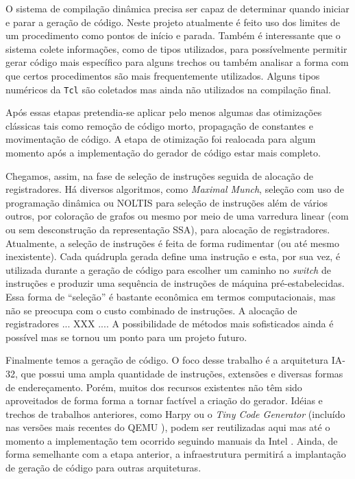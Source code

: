 O sistema de compilação dinâmica precisa ser
capaz de determinar quando iniciar e parar a geração de código.
Neste projeto atualmente é feito uso dos
limites de um procedimento como pontos de início e parada. Também é
interessante que o sistema colete informações, como de tipos
utilizados, para possívelmente permitir gerar código mais específico
para alguns trechos ou também analisar a forma com que certos procedimentos
são mais frequentemente utilizados. Alguns tipos numéricos da
\texttt{Tcl} são coletados mas ainda não utilizados na compilação final.

Após essas etapas pretendia-se aplicar pelo menos algumas das
otimizações clássicas tais como remoção de código morto, propagação de
constantes e movimentação de código. A etapa de otimização foi
realocada para algum momento após a implementação do gerador de código
estar mais completo.

Chegamos, assim, na fase de seleção de instruções
seguida de alocação de registradores. Há diversos algoritmos, como
\textit{Maximal Munch}, seleção com uso de programação dinâmica ou
NOLTIS \cite{noltis}  para seleção de instruções além de vários
outros, por coloração de grafos ou mesmo por meio de uma varredura
linear \cite{linear_scan_regalloc} (com ou sem \cite{wimmer_franz}
desconstrução da representação SSA), para alocação de registradores.
Atualmente, a seleção de instruções é feita de forma
rudimentar (ou até mesmo inexistente). Cada quádrupla gerada define uma
instrução e esta, por sua vez, é utilizada durante a geração de código
para escolher um caminho no \textit{switch} de instruções e produzir
uma sequência de instruções de máquina pré-estabelecidas. Essa forma
de ``seleção'' é bastante econômica em termos computacionais, mas não
se preocupa com o custo combinado de instruções. A alocação de
registradores ... XXX ....
A possibilidade de métodos mais sofisticados ainda é
possível mas se tornou um ponto para um projeto futuro.

Finalmente temos a geração de código. O foco desse trabalho é a
arquitetura IA-32, que possui uma ampla quantidade de instruções, extensões e
diversas formas de endereçamento.
Porém, muitos dos recursos existentes não têm sido aproveitados de forma
forma a tornar factível a criação do gerador.
Idéias e trechos de trabalhos anteriores, como Harpy \cite{harpy}
ou o \textit{Tiny Code Generator} (incluído nas versões mais recentes do
QEMU \cite{qemu}), podem ser reutilizadas aqui mas até o momento a
implementação tem ocorrido seguindo manuais da Intel
\cite{intel_aam}\cite{intel_naz}. Ainda, de forma semelhante com a
etapa anterior, a infraestrutura permitirá a implantação de geração de
código para outras arquiteturas.


